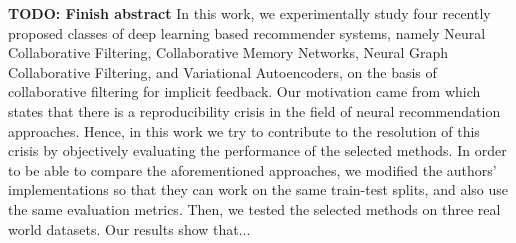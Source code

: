 \textbf{TODO: Finish abstract}
In this work, we experimentally study four recently proposed classes of deep learning based recommender systems, namely Neural Collaborative Filtering, Collaborative Memory Networks, Neural Graph Collaborative Filtering, and Variational Autoencoders, on the basis of collaborative filtering for implicit feedback.
Our motivation came from \cite{dacrema2019we} which states that there is a reproducibility crisis in the field of neural recommendation approaches.
Hence, in this work we try to contribute to the resolution of this crisis by objectively evaluating the performance of the selected methods.
In order to be able to compare the aforementioned approaches, we modified the authors' implementations so that they can work on the same train-test splits, and also use the same evaluation metrics.
Then, we tested the selected methods on three real world datasets.
Our results show that...
